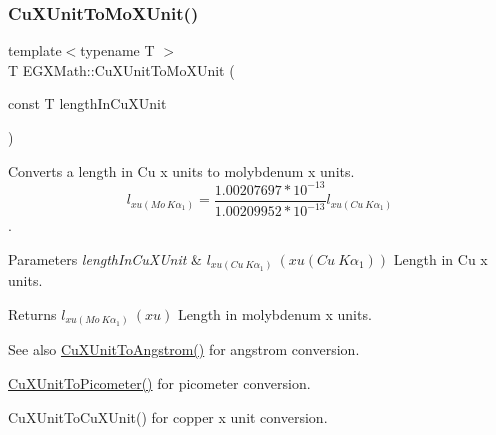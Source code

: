 \subsubsection{\texorpdfstring{Cu\+X\+Unit\+To\+Mo\+X\+Unit()}{CuXUnitToMoXUnit()}}
{\footnotesize\ttfamily template$<$typename T $>$ \\
T E\+G\+X\+Math\+::\+Cu\+X\+Unit\+To\+Mo\+X\+Unit (\begin{DoxyParamCaption}\item[{const T}]{length\+In\+Cu\+X\+Unit }\end{DoxyParamCaption})}



Converts a length in Cu x units to molybdenum x units. \[ l_{xu(Mo\ K\alpha_1)}=\frac{1.00207697*10^{-13}}{1.00209952*10^{-13}} l_{xu(Cu\ K\alpha_1)}\]. 


\begin{DoxyParams}{Parameters}
{\em length\+In\+Cu\+X\+Unit} & $ l_{xu(Cu\ K\alpha_1)}\ (xu(Cu\ K\alpha_1))$ Length in Cu x units. \\
\hline
\end{DoxyParams}
\begin{DoxyReturn}{Returns}
$ l_{xu(Mo\ K\alpha_1)}\ (xu)$ Length in molybdenum x units. 
\end{DoxyReturn}
\begin{DoxySeeAlso}{See also}
\mbox{\hyperlink{group___e_g_x_math-_conversions-_length_conversions-_non-_s_i-_cu_x_unit-_non-_s_i_ga0ccb6fe91bb6437a1c41674613e2e395}{Cu\+X\+Unit\+To\+Angstrom()}} for angstrom conversion. 

\mbox{\hyperlink{group___e_g_x_math-_conversions-_length_conversions-_non-_s_i-_cu_x_unit-_s_i_ga789ff4191ad452d5dc54f4bd3d267566}{Cu\+X\+Unit\+To\+Picometer()}} for picometer conversion. 

Cu\+X\+Unit\+To\+Cu\+X\+Unit() for copper x unit conversion. 
\end{DoxySeeAlso}
